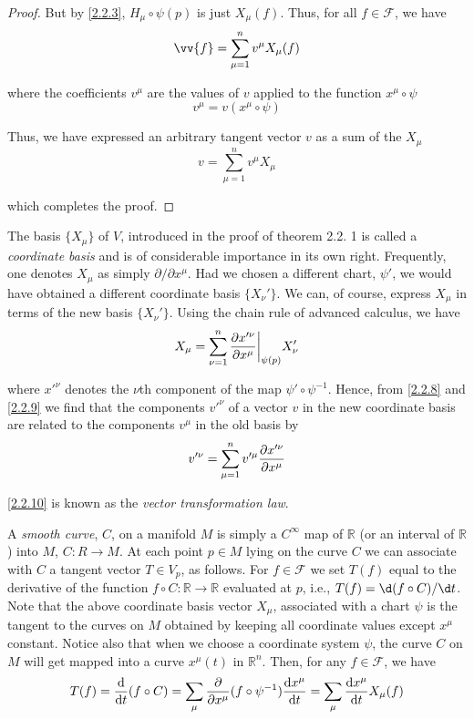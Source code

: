 \begin{proof}
But by \eqref{2.2.3}, $H_\mu\circ\psi(p)$ is just $X_\mu(f)$. Thus, for all $f\in\mathscr{F}$, we have
\begin{equation}
    \vv{f}=\sum_{\mu=1}^nv^\mu X_\mu(f)
    \label{2.2.6}
\end{equation}

where the coefficients $v^\mu$ are the values of $v$ applied to the function $x^\mu\circ\psi$
\begin{equation}
    v^\mu=v(x^\mu\circ\psi)
    \label{2.2.7}
\end{equation}

Thus, we have expressed an arbitrary tangent vector $v$ as a sum of the $X_\mu$
\begin{equation}
    v=\sum_{\mu=1}^nv^\mu X_\mu
    \label{2.2.8}
\end{equation}

which completes the proof.
\end{proof}

The basis $\{X_\mu\}$ of $V$, introduced in the proof of theorem 2.2. 1 is called a \emph{coordinate basis} and is of considerable importance in its own right. Frequently, one denotes $X_\mu$ as simply $\partial/\partial x^\mu$. Had we chosen a different chart, $\psi'$, we would have obtained a different coordinate basis $\{X_\nu'\}$. We can, of course, express $X_\mu$ in terms of the new basis $\{X_\nu'\}$. Using the chain rule of advanced calculus, we have
\begin{equation}
    X_\mu=\sum_{\nu=1}^n\pdv{x'^\nu}{x^\mu}\bigg|_{\psi(p)}X_\nu'
    \label{2.2.9}
\end{equation}

where $x'^\nu$ denotes the $\nu$th component of the map $\psi'\circ\psi^{-1}$. Hence, from \eqref{2.2.8} and \eqref{2.2.9} we find that the components $v'^\nu$ of a vector $v$ in the new coordinate basis are related to the components $v^\mu$ in the old basis by
\begin{equation}
    v'^\nu=\sum_{\mu=1}^nv'^\mu\pdv{x'^\nu}{x^\mu}
    \label{2.2.10}
\end{equation}

\eqref{2.2.10} is known as the \emph{vector transformation law}.

A \emph{smooth curve}, $C$, on a manifold $M$ is simply a $C^\infty$ map of $\mathbb{R}$ (or an interval of $\mathbb{R}$) into $M$, $C:R \to M$. At each point $p\in M$ lying on the curve $C$ we can associate with $C$ a tangent vector $T\in V_p$, as follows. For $f\in\mathscr{F}$ we set $T(f)$ equal to the derivative of the function $f\circ C:\mathbb{R}\to\mathbb{R}$ evaluated at $p$, i.e., $T(f)=\d(f\circ C)/\d t$. Note that the above coordinate basis vector $X_\mu$, associated with a chart $\psi$ is the tangent to the curves on $M$ obtained by keeping all coordinate values except $x^\mu$ constant. Notice also that when we choose a coordinate system $\psi$, the curve $C$ on $M$ will get mapped into a curve $x^\mu(t)$ in $\mathbb{R}^n$. Then, for any $f\in\mathscr{F}$, we have
\begin{equation}
    T(f)=\odv{}t(f\circ C)=\sum_\mu\pdv{}{x^\mu}(f\circ\psi^{-1})\odv{x^\mu}t=\sum_\mu\odv{x^\mu}tX_\mu(f)
    \label{2.2.11}
\end{equation}

